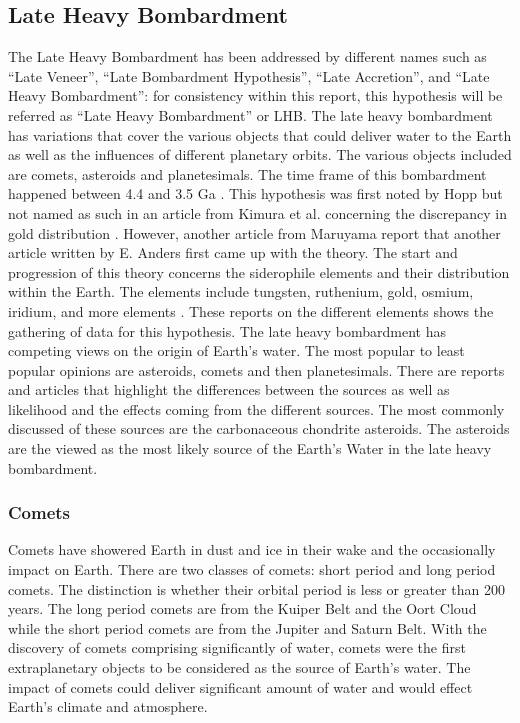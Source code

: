\subsection{Late Heavy Bombardment}
The Late Heavy Bombardment has been addressed by different names such as “Late Veneer”, “Late Bombardment Hypothesis”, “Late Accretion”, and “Late Heavy Bombardment”: for consistency within this report, this hypothesis will be referred as “Late Heavy Bombardment” or LHB. The late heavy bombardment has variations that cover the various objects that could deliver water to the Earth as well as the influences of different planetary orbits. The various objects included are comets, asteroids and planetesimals. The time frame of this bombardment happened between 4.4 and 3.5 Ga \cite{LHB_Timeframe}. This hypothesis was first noted by Hopp\cite{BOMB1} but not named as such in an article from Kimura et al. concerning the discrepancy in gold distribution \cite{BOMB2}. However, another article from Maruyama \cite{BOMB3} report that another article written by E. Anders \cite{BOMB4} first came up with the theory. The start and progression of this theory concerns the siderophile elements and their distribution within the Earth. The elements include tungsten, ruthenium, gold, osmium, iridium, and more elements \cite{BOMB5} \cite{BOMB6} \cite{BOMB7}. These reports on the different elements shows the gathering of data for this hypothesis. The late heavy bombardment has competing views on the origin of Earth’s water. The most popular to least popular opinions are asteroids, comets and then planetesimals. There are reports and articles \cite{BOMB8} \cite{BOMB9} \cite{BOMB10} that highlight the differences between the sources as well as likelihood and the effects coming from the different sources. The most commonly discussed of these sources are the carbonaceous chondrite asteroids. The asteroids are the viewed as the most likely source of the Earth’s Water in the late heavy bombardment.

\subsubsection{Comets}
Comets have showered Earth in dust and ice in their wake and the occasionally impact on Earth. 
There are two classes of comets: short period and long period comets. 
The distinction is whether their orbital period is less or greater than 200 years. 
The long period comets are from the Kuiper Belt and the Oort Cloud while the short period comets are from the Jupiter and Saturn Belt.
With the discovery of comets comprising significantly of water, comets were the first extraplanetary objects to be considered as the source of Earth's water. The impact of comets could deliver significant amount of water and would effect Earth's climate and atmosphere.

